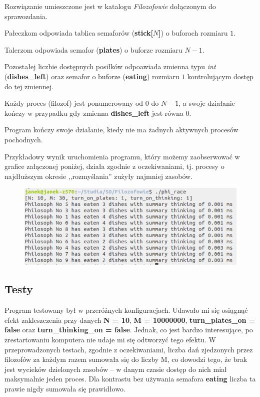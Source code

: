 \documentclass{article}
\begin{document}
\bigskip

Rozwiązanie umieszczone jest w katalogu \emph{Filozofowie} dołączonym do sprawozdania.

Pałeczkom odpowiada tablica semaforów (\textbf{stick[$N$]}) o buforach rozmiaru $1$.

Talerzom odpowiada semafor (\textbf{plates}) o buforze rozmiaru $N-1$.

Pozostałej liczbie dostępnych posiłków odpoawiada zmienna typu \emph{int} (\textbf{dishes\_left}) oraz semafor o buforze (\textbf{eating}) rozmiaru $1$ kontrolującym dostęp do tej zmiennej.

Każdy proces (filozof) jest ponumerowany od $0$ do ${N-1}$, a swoje działanie kończy w przypadku gdy zmienna \textbf{dishes\_left} jest równa 0. 

Program kończy swoje działanie, kiedy nie ma żadnych aktywnych procesów pochodnych.

Przykładowy wynik uruchomienia programu, który możemy zaobserwować w grafice załączonej poniżej, działa zgodnie z oczekiwaniami, tj. procesy o najdłuższym okresie ,,rozmyślania'' zużyły najmniej zasobów.

\begin{figure}[h!]
\centering
\includegraphics[scale=0.5]{example}
\end{figure} 


\subsection{Testy}
Program testowany był w przeróżnych konfiguracjach. Udawało mi się osiągnąć efekt zakleszczenia przy danych \textbf{N = 10}, \textbf{M = 10000000}, \textbf{turn\_plates\_on = false} oraz \textbf{turn\_thinking\_on = false}. Jednak, co jest bardzo interesujące, po zrestartowaniu komputera nie udaje mi się odtworzyć tego efektu. W przeprowadzonych testach, zgodnie z oczekiwaniami, liczba dań zjedzonych przez filozofów za każdym razem sumowała się do liczby M, co dowodzi tego, że brak jest wycieków dzielonych zasobów -- w danym czasie dostęp do nich miał maksymalnie jeden proces. Dla kontrastu bez używania semafora \textbf{eating} liczba ta prawie nigdy sumowała się prawidłowo.
\bigskip
\end{document}
